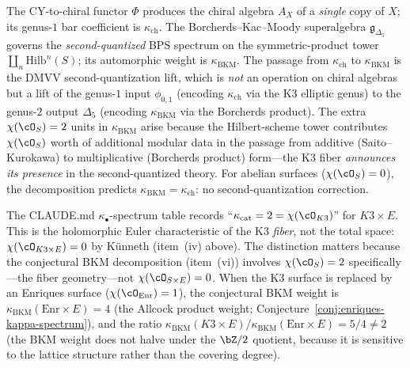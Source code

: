 \begin{remark}
\label{rem:kappa-ch-vs-kappa-bkm-mechanism}
The CY-to-chiral functor $\Phi$ produces the chiral algebra $A_X$ of a \emph{single} copy of $X$; its genus-$1$ bar coefficient is $\kappa_{\mathrm{ch}}$.  The Borcherds--Kac--Moody superalgebra $\mathfrak{g}_{\Delta_5}$ governs the \emph{second-quantized} BPS spectrum on the symmetric-product tower $\coprod_n \mathrm{Hilb}^n(S)$; its automorphic weight is $\kappa_{\mathrm{BKM}}$.  The passage from $\kappa_{\mathrm{ch}}$ to $\kappa_{\mathrm{BKM}}$ is the DMVV second-quantization lift, which is \emph{not} an operation on chiral algebras but a lift of the genus-$1$ input $\phi_{0,1}$ (encoding $\kappa_{\mathrm{ch}}$ via the K3 elliptic genus) to the genus-$2$ output $\Delta_5$ (encoding $\kappa_{\mathrm{BKM}}$ via the Borcherds product).  The extra $\chi(\cO_S) = 2$ units in $\kappa_{\mathrm{BKM}}$ arise because the Hilbert-scheme tower contributes $\chi(\cO_S)$ worth of additional modular data in the passage from additive (Saito--Kurokawa) to multiplicative (Borcherds product) form---the K3 fiber \emph{announces its presence} in the second-quantized theory.  For abelian surfaces ($\chi(\cO_S) = 0$), the decomposition predicts $\kappa_{\mathrm{BKM}} = \kappa_{\mathrm{ch}}$: no second-quantization correction.
\end{remark}

\begin{remark}
\label{rem:kappa-cat-fiber-vs-total}
The CLAUDE.md $\kappa_\bullet$-spectrum table records ``$\kappa_{\mathrm{cat}} = 2 = \chi(\cO_{K3})$'' for $K3 \times E$.  This is the holomorphic Euler characteristic of the K3 \emph{fiber}, not the total space: $\chi(\cO_{K3 \times E}) = 0$ by K\"unneth (item~(iv) above).  The distinction matters because the conjectural BKM decomposition (item~(vi)) involves $\chi(\cO_S) = 2$ specifically---the fiber geometry---not $\chi(\cO_{S \times E}) = 0$.  When the K3 surface is replaced by an Enriques surface ($\chi(\cO_{\mathrm{Enr}}) = 1$), the conjectural BKM weight is $\kappa_{\mathrm{BKM}}(\mathrm{Enr} \times E) = 4$ (the Allcock product weight; Conjecture~\textup{\ref{conj:enriques-kappa-spectrum}}), and the ratio $\kappa_{\mathrm{BKM}}(K3 \times E)/\kappa_{\mathrm{BKM}}(\mathrm{Enr} \times E) = 5/4 \neq 2$ (the BKM weight does not halve under the $\bZ/2$ quotient, because it is sensitive to the lattice structure rather than the covering degree).
\end{remark}

